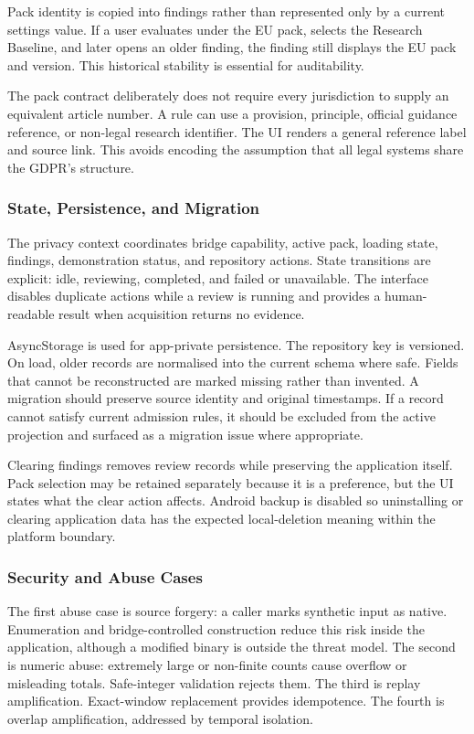 Pack identity is copied into findings rather than represented only by a current settings value. If a user evaluates under the EU pack, selects the Research Baseline, and later opens an older finding, the finding still displays the EU pack and version. This historical stability is essential for auditability.

The pack contract deliberately does not require every jurisdiction to supply an equivalent article number. A rule can use a provision, principle, official guidance reference, or non-legal research identifier. The UI renders a general reference label and source link. This avoids encoding the assumption that all legal systems share the GDPR's structure.

\subsubsection{State, Persistence, and Migration}

The privacy context coordinates bridge capability, active pack, loading state, findings, demonstration status, and repository actions. State transitions are explicit: idle, reviewing, completed, and failed or unavailable. The interface disables duplicate actions while a review is running and provides a human-readable result when acquisition returns no evidence.

AsyncStorage is used for app-private persistence. The repository key is versioned. On load, older records are normalised into the current schema where safe. Fields that cannot be reconstructed are marked missing rather than invented. A migration should preserve source identity and original timestamps. If a record cannot satisfy current admission rules, it should be excluded from the active projection and surfaced as a migration issue where appropriate.

Clearing findings removes review records while preserving the application itself. Pack selection may be retained separately because it is a preference, but the UI states what the clear action affects. Android backup is disabled so uninstalling or clearing application data has the expected local-deletion meaning within the platform boundary.

\subsubsection{Security and Abuse Cases}

The first abuse case is source forgery: a caller marks synthetic input as native. Enumeration and bridge-controlled construction reduce this risk inside the application, although a modified binary is outside the threat model. The second is numeric abuse: extremely large or non-finite counts cause overflow or misleading totals. Safe-integer validation rejects them. The third is replay amplification. Exact-window replacement provides idempotence. The fourth is overlap amplification, addressed by temporal isolation.

